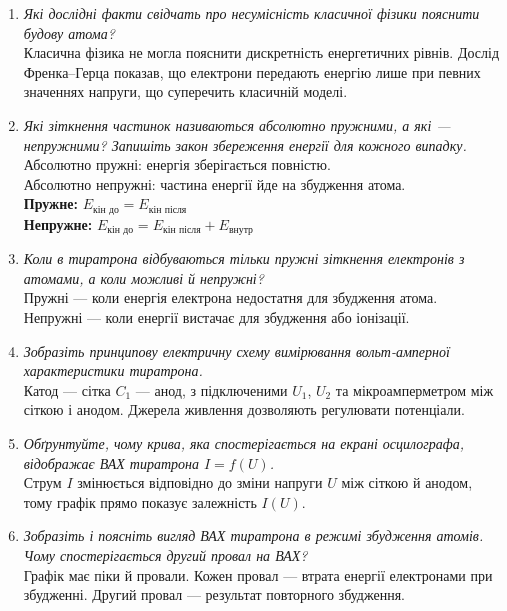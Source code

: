 \documentclass[12pt,a4paper]{article}
\begin{document}
    \begin{enumerate}
        \item \textit{Які дослідні факти свідчать про несумісність класичної фізики пояснити будову атома?}\\[0.5em]
        Класична фізика не могла пояснити дискретність енергетичних рівнів. Дослід Френка–Герца показав, що електрони передають енергію лише при певних значеннях напруги, що суперечить класичній моделі.

        \item \textit{Які зіткнення частинок називаються абсолютно пружними, а які — непружними? Запишіть закон збереження енергії для кожного випадку.}\\[0.5em]
        Абсолютно пружні: енергія зберігається повністю.\\
        Абсолютно непружні: частина енергії йде на збудження атома.\\
        \textbf{Пружне:} $E_{\text{кін до}} = E_{\text{кін після}}$\\
        \textbf{Непружне:} $E_{\text{кін до}} = E_{\text{кін після}} + E_{\text{внутр}}$

        \item \textit{Коли в тиратрона відбуваються тільки пружні зіткнення електронів з атомами, а коли можливі й непружні?}\\[0.5em]
        Пружні — коли енергія електрона недостатня для збудження атома.\\
        Непружні — коли енергії вистачає для збудження або іонізації.

        \item \textit{Зобразіть принципову електричну схему вимірювання вольт-амперної характеристики тиратрона.}\\[0.5em]
        Катод — сітка $C_1$ — анод, з підключеними $U_1$, $U_2$ та мікроамперметром між сіткою і анодом. Джерела живлення дозволяють регулювати потенціали.

        \item \textit{Обґрунтуйте, чому крива, яка спостерігається на екрані осцилографа, відображає ВАХ тиратрона $I = f(U)$.}\\[0.5em]
        Струм $I$ змінюється відповідно до зміни напруги $U$ між сіткою й анодом, тому графік прямо показує залежність $I(U)$.

        \item \textit{Зобразіть і поясніть вигляд ВАХ тиратрона в режимі збудження атомів. Чому спостерігається другий провал на ВАХ?}\\[0.5em]
        Графік має піки й провали. Кожен провал — втрата енергії електронами при збудженні. Другий провал — результат повторного збудження.


\end{enumerate}
\end{document}
